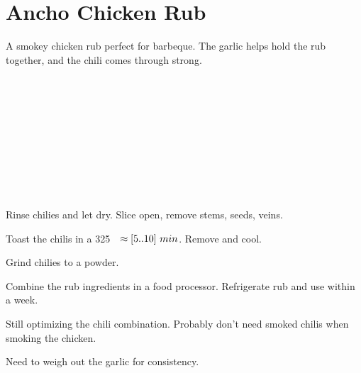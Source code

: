 \section[Ancho Rub]{Ancho Chicken Rub}

\begin{recipestats}[
        servings=10 \fluidounce,
        bakingtime=10 \minute,
        preptime=30 \minute,
        inactivetime=$[3 \ldots 12]~\hour$,
        source=Mike \& Jane,
    ]
\end{recipestats}

\begin{recipeabstract}
    A smokey chicken rub perfect for barbeque.
    The garlic helps hold the rub together, and the chili comes through strong.
\end{recipeabstract}

\begin{ingredientcolumns}
    \begin{ingredientblock}[rub]
        \\
        \\
        \\
        \\
        \\
        \\
    \end{ingredientblock}
    \begin{ingredientblock}
        \\
        \\
    \end{ingredientblock}
\end{ingredientcolumns}

\begin{preparation}
\item Rinse chilies and let dry.
    Slice open, remove stems, seeds, veins.

\item Toast the chilis in a 325~\Fahrenheit~$\approx[5..10]~\minute$.
    Remove and cool.

\item Grind chilies to a powder.

\item Combine the rub ingredients in a food processor.
    Refrigerate rub and use within a week.
\end{preparation}

\begin{experiments}
\item Still optimizing the chili combination.
    Probably don't need smoked chilis when smoking the chicken.

\item Need to weigh out the garlic for consistency.
\end{experiments}

\recipeend%

